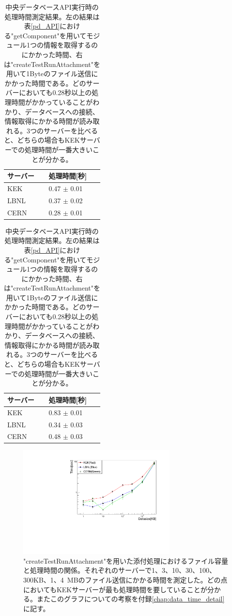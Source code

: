 \begin{table}[tbp]
  \caption[中央データベースAPI実行時の処理時間測定結果。]{中央データベースAPI実行時の処理時間測定結果。左の結果は表\ref{pd_API}における"getComponent"を用いてモジュール1つの情報を取得するのにかかった時間、右は"createTestRunAttachment"を用いて1Byteのファイル送信にかかった時間である。どのサーバーにおいても0.28秒以上の処理時間がかかっていることがわかり、データベースへの接続、情報取得にかかる時間が読み取れる。3つのサーバーを比べると、どちらの場合もKEKサーバーでの処理時間が一番大きいことが分かる。}
  \label{use_prodDB_API}
  \begin{minipage}[t]{.45\textwidth}
  \begin{center}
    \begin{tabular}{|ll|} \hline
      サーバー & 処理時間[秒] \\ \hline
      KEK & 0.47 $\pm$ 0.01 \\ 
      LBNL & 0.37 $\pm$ 0.02 \\ 
      CERN & 0.28 $\pm$ 0.01 \\ \hline 
    \end{tabular}
  \end{center}
  \end{minipage}
  \hfill 
  \begin{minipage}[t]{.45\textwidth}
  \begin{center}
    \begin{tabular}{|ll|} \hline
      サーバー & 処理時間[秒] \\ \hline
      KEK & 0.83 $\pm$ 0.01 \\ 
      LBNL & 0.34 $\pm$ 0.03 \\ 
      CERN & 0.48 $\pm$ 0.03 \\ \hline 
    \end{tabular}
  \end{center}
  \end{minipage}
\end{table}

\begin{figure}[bpt]\centering
  \begin{center}
    \includegraphics[width=8cm,angle=270]{./datasize_vs_time_new.pdf}
  \caption["createTestRunAttachment"を用いた添付処理におけるファイル容量と処理時間の関係]{"createTestRunAttachment"を用いた添付処理におけるファイル容量と処理時間の関係。それぞれのサーバーで1、3、10、30、100、300KB、1、4~MBのファイル送信にかかる時間を測定した。どの点においてもKEKサーバーが最も処理時間を要していることが分かる。またこのグラフについての考察を付録\ref{chap:data_time_detail}に記す。}
  \label{datasize_vs_time}
  \end{center}
\end{figure}

